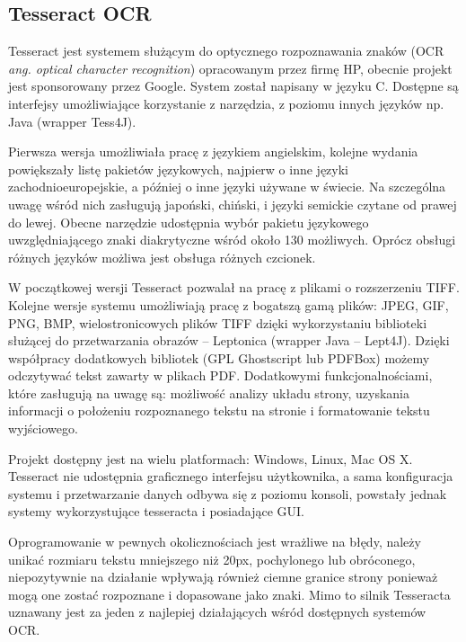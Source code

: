 \documentclass[a4paper,12pt]{article}
\newcommand\spacingIndent{2.2em}
\begin{document}
        
        
	\subsection{Tesseract OCR}
	    \hspace{\spacingIndent} Tesseract jest systemem służącym do optycznego rozpoznawania znaków (OCR \textit{ang. optical character recognition}) 
			opracowanym przez firmę HP, obecnie projekt jest sponsorowany przez Google. System został napisany w języku C. 
			Dostępne są interfejsy umożliwiające korzystanie z narzędzia, z poziomu innych języków np. Java (wrapper Tess4J). 
			
			 Pierwsza wersja umożliwiała pracę z językiem angielskim, kolejne wydania powiększały listę pakietów językowych, 
			najpierw o inne języki zachodnioeuropejskie, a później o inne języki używane w świecie. Na szczególna uwagę wśród nich zasługują japoński, chiński, 
			i języki semickie czytane od prawej do lewej. Obecne narzędzie udostępnia wybór pakietu językowego uwzględniającego 
			znaki diakrytyczne wśród około 130 możliwych. Oprócz obsługi różnych języków możliwa jest obsługa różnych czcionek. 
			
			W początkowej wersji Tesseract pozwalał na pracę z plikami o rozszerzeniu TIFF. Kolejne wersje systemu umożliwiają pracę z bogatszą gamą plików: 
			JPEG, GIF, PNG, BMP, wielostronicowych plików TIFF dzięki wykorzystaniu biblioteki służącej do przetwarzania obrazów -- Leptonica 
			(wrapper Java -- Lept4J). Dzięki współpracy dodatkowych bibliotek (GPL Ghostscript lub PDFBox) możemy odczytywać tekst zawarty w plikach PDF.			Dodatkowymi funkcjonalnościami, które zasługują na uwagę są: możliwość analizy układu strony, uzyskania informacji o położeniu rozpoznanego tekstu na stronie 
			i formatowanie tekstu wyjściowego. 
			
			Projekt dostępny jest na wielu platformach: Windows, Linux, Mac OS X. Tesseract nie udostępnia graficznego interfejsu użytkownika, 
			a sama konfiguracja systemu i przetwarzanie danych odbywa się z poziomu konsoli, powstały jednak systemy wykorzystujące tesseracta i posiadające GUI. 
			
			Oprogramowanie w pewnych okolicznościach jest wrażliwe na błędy, należy unikać rozmiaru tekstu mniejszego niż 20px, pochylonego lub obróconego, 
			niepozytywnie na działanie wpływają również ciemne granice strony ponieważ mogą one zostać rozpoznane i dopasowane jako znaki. Mimo to silnik Tesseracta uznawany jest za jeden z najlepiej działających wśród dostępnych systemów OCR. 
\end{document}
